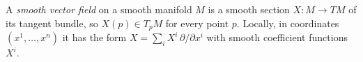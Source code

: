 
A \emph{smooth vector field} on a smooth manifold $M$ is a smooth section $X:M\to TM$ of its tangent bundle, so $X(p)\in T_pM$ for every point $p$. Locally, in coordinates $(x^1,\ldots,x^n)$ it has the form $X=\sum_i X^i\,\partial/\partial x^i$ with smooth coefficient functions $X^i$.
